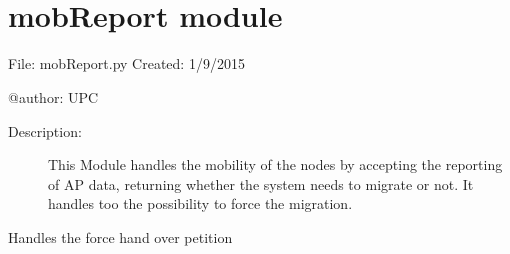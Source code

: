 \documentclass[letterpaper,10pt,oneside]{sphinxmanual}
\begin{document}

\begin{fulllineitems}
\label{fakeOrch:fakeOrch.getConf}~

\begin{fulllineitems}
\label{fakeOrch:fakeOrch.getConf.on_get}
\end{fulllineitems}


\end{fulllineitems}


\begin{fulllineitems}
\label{fakeOrch:fakeOrch.getGraph}~

\begin{fulllineitems}
\label{fakeOrch:fakeOrch.getGraph.on_get}
\end{fulllineitems}


\end{fulllineitems}



\chapter{mobReport module}
\label{mobReport::doc}\label{mobReport:mobreport-module}\label{mobReport:module-mobReport}
File:       mobReport.py
Created:    1/9/2015

@author:    UPC
\begin{description}
\item[{Description:}] \leavevmode
This Module handles the mobility of the nodes by accepting the
reporting of AP data, returning whether the system needs to migrate
or not. It handles too the possibility to force the migration.

\end{description}

\begin{fulllineitems}
\label{mobReport:mobReport.forceHandOver}
Handles the force hand over petition

\begin{fulllineitems}
\label{mobReport:mobReport.forceHandOver.on_get}
\end{fulllineitems}


\end{fulllineitems}
\end{document}
